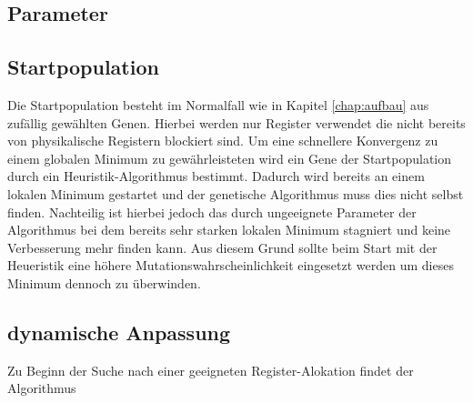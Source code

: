 \subsection{Parameter}
 
\subsection{Startpopulation}
Die Startpopulation besteht im Normalfall wie in Kapitel \ref{chap:aufbau} aus zufällig gewählten Genen. Hierbei werden nur Register verwendet die nicht bereits von physikalische Registern blockiert sind.
Um eine schnellere Konvergenz zu einem globalen Minimum zu gewährleisteten wird ein Gene der Startpopulation durch ein Heuristik-Algorithmus bestimmt. Dadurch wird bereits an einem lokalen Minimum gestartet und der genetische Algorithmus muss dies nicht selbst finden. 
Nachteilig ist hierbei jedoch das durch ungeeignete Parameter der Algorithmus bei dem bereits sehr starken lokalen Minimum stagniert und keine Verbesserung mehr finden kann. Aus diesem Grund sollte beim Start mit der Heueristik eine höhere Mutationswahrscheinlichkeit eingesetzt werden um dieses Minimum dennoch zu überwinden.

\subsection{dynamische Anpassung}
Zu Beginn der Suche nach einer geeigneten Register-Alokation findet der Algorithmus
\newpage
